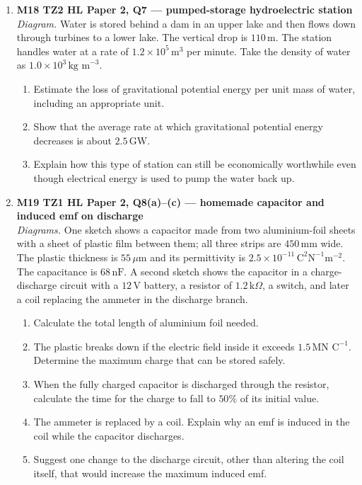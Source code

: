 \documentclass[11pt]{article}
\begin{document}
\begin{enumerate}[leftmargin=*, itemsep=1.1em]
\item \textbf{M18 TZ2 HL Paper 2, Q7 --- pumped-storage hydroelectric station}\\
\textit{Diagram.} Water is stored behind a dam in an upper lake and then flows down through turbines to a lower lake. The vertical drop is $110\,\text{m}$. The station handles water at a rate of $1.2\times10^{5}\,\text{m}^3$ per minute. Take the density of water as $1.0\times10^{3}\,\text{kg m}^{-3}$.
\begin{enumerate}[label=(\alph*)]
\item Estimate the loss of gravitational potential energy per unit mass of water, including an appropriate unit.
\item Show that the average rate at which gravitational potential energy decreases is about $2.5\,\text{GW}$.
\item Explain how this type of station can still be economically worthwhile even though electrical energy is used to pump the water back up.
\end{enumerate}

\item \textbf{M19 TZ1 HL Paper 2, Q8(a)--(c) --- homemade capacitor and induced emf on discharge}\\
\textit{Diagrams.} One sketch shows a capacitor made from two aluminium-foil sheets with a sheet of plastic film between them; all three strips are $450\,\text{mm}$ wide. The plastic thickness is $55\,\mu\text{m}$ and its permittivity is $2.5\times10^{-11}\,\text{C}^{2}\text{N}^{-1}\text{m}^{-2}$. The capacitance is $68\,\text{nF}$. A second sketch shows the capacitor in a charge-discharge circuit with a $12\,\text{V}$ battery, a resistor of $1.2\,\text{k}\Omega$, a switch, and later a coil replacing the ammeter in the discharge branch.
\begin{enumerate}[label=(\alph*)]
\item Calculate the total length of aluminium foil needed.
\item The plastic breaks down if the electric field inside it exceeds $1.5\,\text{MN C}^{-1}$. Determine the maximum charge that can be stored safely.
\item When the fully charged capacitor is discharged through the resistor, calculate the time for the charge to fall to $50\%$ of its initial value.
\item The ammeter is replaced by a coil. Explain why an emf is induced in the coil while the capacitor discharges.
\item Suggest one change to the discharge circuit, other than altering the coil itself, that would increase the maximum induced emf.
\end{enumerate}


\end{enumerate}
\end{document}
